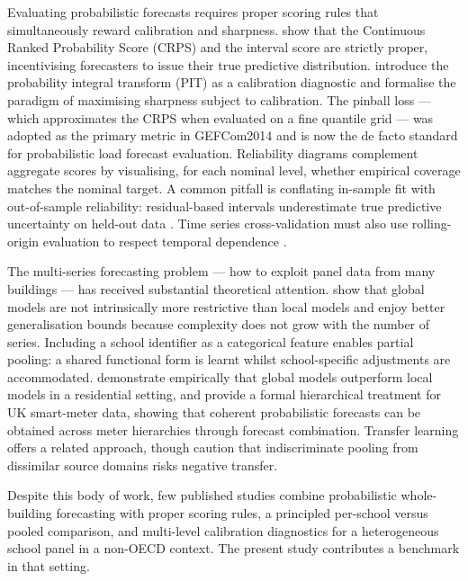 \documentclass[12pt,a4paper]{article}
\begin{document}
Evaluating probabilistic forecasts requires proper scoring rules that simultaneously reward calibration and sharpness. \citet{gneitingraftery2007} show that the Continuous Ranked Probability Score (CRPS) and the interval score are strictly proper, incentivising forecasters to issue their true predictive distribution. \citet{gneitingbal2007} introduce the probability integral transform (PIT) as a calibration diagnostic and formalise the paradigm of maximising sharpness subject to calibration. The pinball loss --- which approximates the CRPS when evaluated on a fine quantile grid --- was adopted as the primary metric in GEFCom2014 \citep{hong2016gefcom} and is now the de facto standard for probabilistic load forecast evaluation. Reliability diagrams complement aggregate scores by visualising, for each nominal level, whether empirical coverage matches the nominal target. A common pitfall is conflating in-sample fit with out-of-sample reliability: residual-based intervals underestimate true predictive uncertainty on held-out data \citep{he2022}. Time series cross-validation must also use rolling-origin evaluation to respect temporal dependence \citep{hyndman2021}.

The multi-series forecasting problem --- how to exploit panel data from many buildings --- has received substantial theoretical attention. \citet{montero2021} show that global models are not intrinsically more restrictive than local models and enjoy better generalisation bounds because complexity does not grow with the number of series. Including a school identifier as a categorical feature enables partial pooling: a shared functional form is learnt whilst school-specific adjustments are accommodated. \citet{candanedo2022} demonstrate empirically that global models outperform local models in a residential setting, and \citet{bentaieb2021} provide a formal hierarchical treatment for UK smart-meter data, showing that coherent probabilistic forecasts can be obtained across meter hierarchies through forecast combination. Transfer learning offers a related approach, though \citet{qian2024} caution that indiscriminate pooling from dissimilar source domains risks negative transfer.

Despite this body of work, few published studies combine probabilistic whole-building forecasting with proper scoring rules, a principled per-school versus pooled comparison, and multi-level calibration diagnostics for a heterogeneous school panel in a non-OECD context. The present study contributes a benchmark in that setting.
\end{document}
